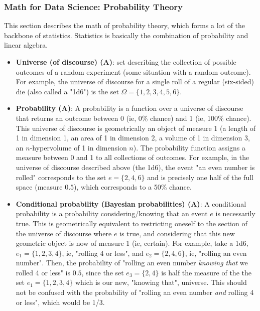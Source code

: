 \documentclass{article}
\begin{document}
\subsubsection*{Math for Data Science: Probability Theory}

This section describes the math of probability theory, which forms a lot of the backbone of statistics. Statistics is basically the combination of probability and linear algebra.

\begin{itemize}

	\item \textbf{Universe (of discourse) (A)}: set describing the collection of possible outcomes of a random experiment (some situation with a random outcome). For example, the universe of discourse for a single roll of a regular (six-sided) die (also called a "1d6") is the set $\Omega = \{ 1, 2, 3, 4, 5, 6 \}$.

	\item \textbf{Probability (A)}: A probability is a function over a universe of discourse that returns an outcome between 0 (ie, 0\% chance) and 1 (ie, 100\% chance). This universe of discourse is geometrically an object of measure 1 (a length of 1 in dimension 1, an area of 1 in dimension 2, a volume of 1 in dimension 3, an $n$-hypervolume of 1 in dimension $n$). The probability function assigns a measure between 0 and 1 to all collections of outcomes. For example, in the universe of discourse described above (the 1d6), the event "an even number is rolled" corresponds to the set $e = \{ 2, 4, 6 \}$ and is precisely one half of the full space (measure $0.5$), which corresponds to a 50\% chance.

	\item \textbf{Conditional probability (Bayesian probabilities) (A)}: A conditional probability is a probability considering/knowing that an event $e$ is necessarily true. This is geometrically equivalent to restricting oneself to the section of the universe of discourse where $e$ is true, and considering that this new geometric object is now of measure 1 (ie, certain). For example, take a 1d6, $e_1 = \{ 1, 2, 3, 4 \}$, ie, "rolling 4 or less", and $e_2 = \{ 2, 4, 6 \}$, ie, "rolling an even number". Then, the probability of "rolling an even number \textit{knowing that} we rolled 4 or less" is $0.5$, since the set $e_3 = \{ 2, 4 \}$ is half the measure of the the set $e_1 = \{ 1, 2, 3, 4 \}$ which is our new, "knowing that", universe. This should not be confused with the probability of "rolling an even number \textit{and} rolling 4 or less", which would be 1/3.


\end{itemize}
\end{document}

